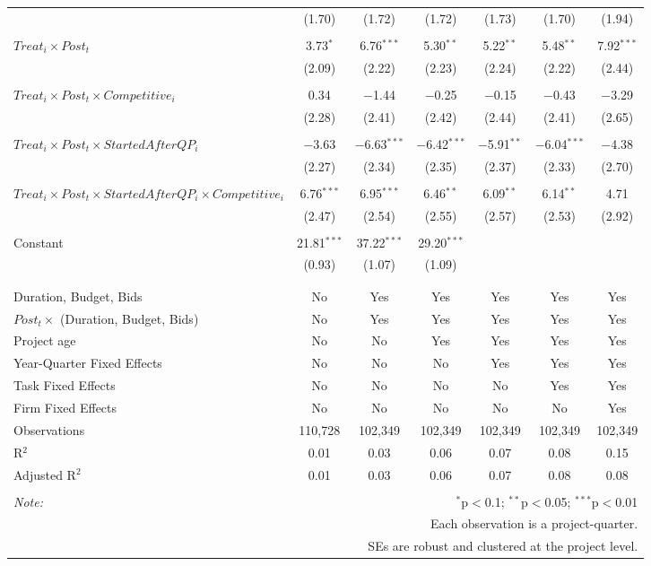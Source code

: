 \documentclass[
]{article}
\begin{document}
\begin{table}[H]
\begin{tabular}{@{\extracolsep{-3pt}}lcccccc}
  & (1.70) & (1.72) & (1.72) & (1.73) & (1.70) & (1.94) \\ 
  & & & & & & \\ 
 $Treat_i \times Post_t$ & 3.73$^{*}$ & 6.76$^{***}$ & 5.30$^{**}$ & 5.22$^{**}$ & 5.48$^{**}$ & 7.92$^{***}$ \\ 
  & (2.09) & (2.22) & (2.23) & (2.24) & (2.22) & (2.44) \\ 
  & & & & & & \\ 
 $Treat_i \times Post_t \times Competitive_i$ & 0.34 & $-$1.44 & $-$0.25 & $-$0.15 & $-$0.43 & $-$3.29 \\ 
  & (2.28) & (2.41) & (2.42) & (2.44) & (2.41) & (2.65) \\ 
  & & & & & & \\ 
 $Treat_i \times Post_t \times StartedAfterQP_i$ & $-$3.63 & $-$6.63$^{***}$ & $-$6.42$^{***}$ & $-$5.91$^{**}$ & $-$6.04$^{***}$ & $-$4.38 \\ 
  & (2.27) & (2.34) & (2.35) & (2.37) & (2.33) & (2.70) \\ 
  & & & & & & \\ 
 $Treat_i \times Post_t \times StartedAfterQP_i \times Competitive_i$ & 6.76$^{***}$ & 6.95$^{***}$ & 6.46$^{**}$ & 6.09$^{**}$ & 6.14$^{**}$ & 4.71 \\ 
  & (2.47) & (2.54) & (2.55) & (2.57) & (2.53) & (2.92) \\ 
  & & & & & & \\ 
 Constant & 21.81$^{***}$ & 37.22$^{***}$ & 29.20$^{***}$ &  &  &  \\ 
  & (0.93) & (1.07) & (1.09) &  &  &  \\ 
  & & & & & & \\ 
\hline \\[-1.8ex] 
Duration, Budget, Bids & No & Yes & Yes & Yes & Yes & Yes \\ 
$Post_t \times $  (Duration, Budget, Bids) & No & Yes & Yes & Yes & Yes & Yes \\ 
Project age & No & No & Yes & Yes & Yes & Yes \\ 
Year-Quarter Fixed Effects & No & No & No & Yes & Yes & Yes \\ 
Task Fixed Effects & No & No & No & No & Yes & Yes \\ 
Firm Fixed Effects & No & No & No & No & No & Yes \\ 
Observations & 110,728 & 102,349 & 102,349 & 102,349 & 102,349 & 102,349 \\ 
R$^{2}$ & 0.01 & 0.03 & 0.06 & 0.07 & 0.08 & 0.15 \\ 
Adjusted R$^{2}$ & 0.01 & 0.03 & 0.06 & 0.07 & 0.08 & 0.08 \\ 
\hline 
\hline \\[-1.8ex] 
\textit{Note:}  & \multicolumn{6}{r}{$^{*}$p$<$0.1; $^{**}$p$<$0.05; $^{***}$p$<$0.01} \\ 
 & \multicolumn{6}{r}{Each observation is a project-quarter.} \\ 
 & \multicolumn{6}{r}{SEs are robust and clustered at the project level.} \\ 
\end{tabular} 
\end{table}
\end{document}
